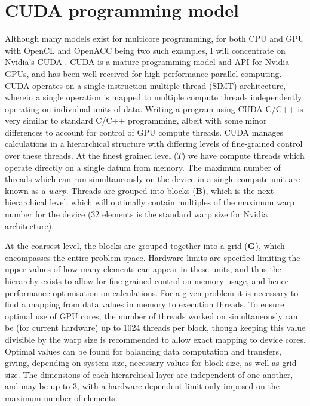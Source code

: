\section{CUDA programming model}\label{sec:cuda_prog}
Although many models exist for multicore programming, for both CPU and GPU with OpenCL and OpenACC being two such examples, I will concentrate on Nvidia's CUDA \cite{NUM:Nickolls_cuda_2008}. CUDA is a mature programming model and API for Nvidia GPUs, and has been well-received for high-performance parallel computing. CUDA operates on a single instruction multiple thread (SIMT) architecture, wherein a single operation is mapped to multiple compute threads independently operating on individual units of data. Writing a program using CUDA C/C++ is very similar to standard C/C++ programming, albeit with some minor differences to account for control of GPU compute threads. CUDA manages calculations in a hierarchical structure with differing levels of fine-grained control over these threads. At the finest grained level ($T$) we have compute threads which operate directly on a single datum from memory. The maximum number of threads which can run simultaneously on the device in a single compute unit are known as a \textit{warp}. Threads are grouped into blocks ($\mathbf{B}$), which is the next hierarchical level, which will optimally contain multiples of the maximum warp number for the device (32 elements is the standard warp size for Nvidia architecture).

At the coarsest level, the blocks are grouped together into a grid ($\mathbf{G}$), which encompasses the entire problem space. Hardware limits are specified limiting the upper-values of how many elements can appear in these units, and thus the hierarchy exists to allow for fine-grained control on memory usage, and hence performance optimisation on calculations. For a given problem it is necessary to find a mapping from data values in memory to execution threads. To ensure optimal use of GPU cores, the number of threads worked on simultaneously can be (for current hardware) up to 1024 threads per block, though keeping this value divisible by the warp size is recommended to allow exact mapping to device cores. Optimal values can be found for balancing data computation and transfers, giving, depending on system size, necessary values for block size, as well as grid size. The dimensions of each hierarchical layer are independent of one another, and may be up to 3, with a hardware dependent limit only imposed on the maximum number of elements.

